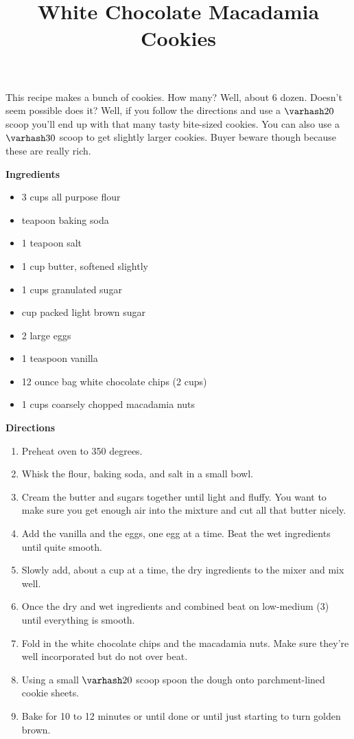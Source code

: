 \documentclass{article}
\title{White Chocolate Macadamia Cookies}
\begin{document}
This recipe makes a bunch of cookies. How many? Well, about 6 dozen. Doesn't seem possible does it? Well,
if you follow the directions and use a $\varhash 20$ scoop you'll end up with that many tasty bite-sized
cookies. You can also use a $\varhash 30$ scoop to get slightly larger cookies. Buyer beware though because
these are really rich.

\textbf{Ingredients}

\begin{multicols}{2}

    \begin{itemize}
        \item 3 cups all purpose flour
        \item {} teapoon baking soda
        \item 1 teapoon salt
        \item 1 cup butter, softened slightly
        \item 1 cups granulated sugar
        \item {} cup packed light brown sugar
        \item 2 large eggs
        \item 1 teaspoon vanilla
        \item 12 ounce bag white chocolate chips (2 cups)
        \item 1 cups coarsely chopped macadamia nuts
    \end{itemize}
\end{multicols}

\textbf{Directions}

\begin{enumerate}
    \item Preheat oven to 350 degrees.
    \item Whisk the flour, baking soda, and salt in a small bowl.
    \item Cream the butter and sugars together until light and fluffy. You want to make sure you get
          enough air into the mixture and cut all that butter nicely.
    \item Add the vanilla and the eggs, one egg at a time. Beat the wet ingredients until quite smooth.
    \item Slowly add, about a cup at a time, the dry ingredients to the mixer and mix well.
    \item Once the dry and wet ingredients and combined beat on low-medium (3) until
          everything is smooth.
    \item Fold in the white chocolate chips and the macadamia nuts. Make sure they're well
          incorporated but do not over beat.
    \item Using a small $\varhash 20$ scoop spoon the dough onto parchment-lined cookie sheets.
    \item Bake for 10 to 12 minutes or until done or until just starting to turn golden brown.
\end{enumerate}
\end{document}
